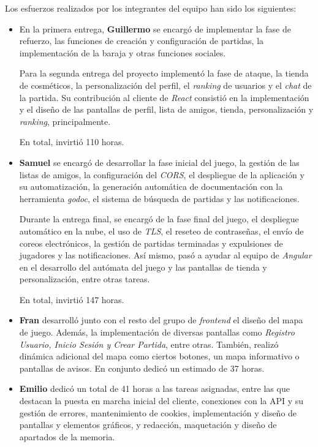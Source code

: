 \documentclass[11pt, a4paper, titlepage]{article}
\begin{document}
Los esfuerzos realizados por los integrantes del equipo han sido los siguientes:

\begin{itemize}
    \item En la primera entrega, \textbf{Guillermo} se encargó de implementar la fase de refuerzo, las funciones de creación y configuración de partidas, la implementación de la baraja y otras funciones sociales. 
    
    Para la segunda entrega del proyecto implementó la fase de ataque, la tienda de cosméticos, la personalización del perfil, el \textit{ranking} de usuarios y el \textit{chat} de la partida. Su contribución al cliente de \textit{React} consistió en la implementación y el diseño de las pantallas de perfil, lista de amigos, tienda, personalización y \textit{ranking}, principalmente.
    
    En total, invirtió 110 horas.

    \item \textbf{Samuel} se encargó de desarrollar la fase inicial del juego, la gestión de las listas de amigos, la configuración del \textit{CORS}, el despliegue de la aplicación y su automatización, la generación automática de documentación con la herramienta \textit{godoc}, el sistema de búsqueda de partidas y las notificaciones.
    
    Durante la entrega final, se encargó de la fase final del juego, el despliegue automático en la nube, el uso de \textit{TLS}, el reseteo de contraseñas, el envío de coreos electrónicos, la gestión de partidas terminadas y expulsiones de jugadores y las notificaciones. Así mismo, pasó a ayudar al equipo de \textit{Angular} en el desarrollo del autómata del juego y las pantallas de tienda y personalización, entre otras tareas.
    
    En total, invirtió 147 horas.

    \item \textbf{Fran} desarrolló junto con el resto del grupo de \textit{frontend} el diseño del mapa de juego. Además, la implementación de diversas pantallas como \textit{Registro Usuario, Inicio Sesión y Crear Partida}, entre otras. También, realizó dinámica adicional del mapa como ciertos botones, un mapa informativo o pantallas de avisos. En conjunto dedicó un estimado de 37 horas.

    \item \textbf{Emilio} dedicó un total de 41 horas a las tareas asignadas, entre las que destacan la puesta en marcha inicial del cliente, conexiones con la API y su gestión de errores, mantenimiento de cookies, implementación y diseño de pantallas y elementos gráficos, y redacción, maquetación y diseño de apartados de la memoria.


\end{itemize}
\end{document}
